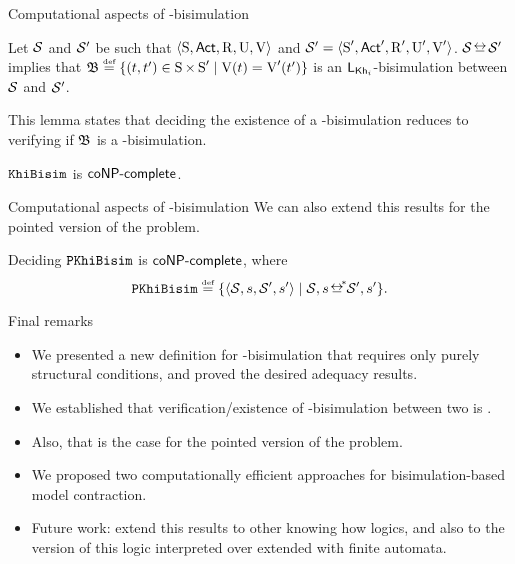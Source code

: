 \documentclass{beamer}
\begin{document}

\begin{frame}{Computational aspects of \KHilogic-bisimulation}
    \begin{lemma}
        Let $\mathcal{S}$ and $\mathcal{S}'$ be \ults such that $\langle \operatorname{S},{\rm \sf Act},\operatorname{R},\operatorname{U},\operatorname{V} \rangle$ and $\mathcal{S}' = \langle \operatorname{S}',{\rm \sf Act}',\operatorname{R}',\operatorname{U}',\operatorname{V}' \rangle$.
        $\model\bisim\model'$ implies that $\universalbis\eqdef\set{(t,t')\in\W\times\W'\mid \V(t)=\V'(t')}$ is an $\mathsf{L}_{\operatorname{\sf Kh}_i}$-bisimulation between $\mathcal{S}$ and $\mathcal{S}'$. 
    \end{lemma}\pause

    This lemma states that deciding the existence of a \KHilogic-bisimulation reduces to verifying if $\mathfrak{B}$ is a \KHilogic-bisimulation.\pause

    \begin{theorem}
        $\mathtt{KhiBisim}$ is $\rm\textsf{coNP-complete}$.
    \end{theorem}
\end{frame}


\begin{frame}{Computational aspects of \KHilogic-bisimulation}
    We can also extend this results for the pointed version of the problem.\pause

    \begin{corollary}
        Deciding $\mathtt{PKhiBisim}$ is $\rm\textsf{coNP-complete}$, where 
        \[ 
            \pkhibisimpb \eqdef \set{\tup{\model,s,\model',s'} \mid \model,s \nbisim\model',s'}.
        \]
    \end{corollary}
\end{frame}




\begin{frame}
    {Final remarks}

    \begin{small}
        \begin{itemize}
            \item We presented a new definition for \KHilogic-bisimulation that requires only purely structural conditions, and proved the desired adequacy results. \pause
            \item We established that verification/existence of \KHilogic-bisimulation between two \ultss is \coNPComplete. \pause
            \item Also, that is the case for the pointed version of the problem. \pause
            \item We proposed two computationally efficient approaches for bisimulation-based model contraction. \pause
            \item Future work: extend this results to other knowing how logics, and also to the version of this logic interpreted 
            over \ults extended with finite automata.
        \end{itemize}
    \end{small}
\end{frame}

\end{document}
